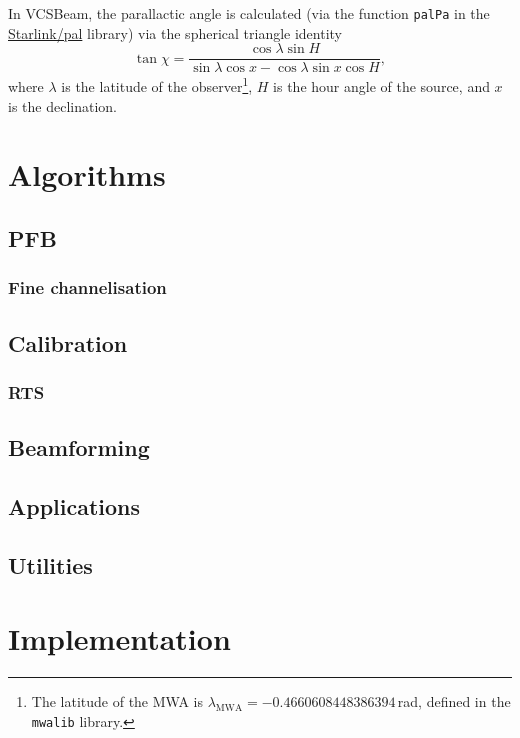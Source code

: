 \documentclass{book}
\newcommand{\vcsbeam}{{\sc VCSBeam}}
\begin{document}
In \vcsbeam{}, the parallactic angle is calculated (via the function \texttt{palPa} in the \href{https://github.com/Starlink/pal}{Starlink/pal} library) via the spherical triangle identity
\begin{equation}
    \tan \chi = \frac{\cos \lambda \sin H}{\sin\lambda \cos x - \cos \lambda \sin x \cos H},
\end{equation}
where $\lambda$ is the latitude of the observer\footnote{The latitude of the MWA is $\lambda_\text{MWA} = -0.4660608448386394\,$rad, defined in the \texttt{mwalib} library.}, $H$ is the hour angle of the source, and $x$ is the declination.

\chapter{Algorithms}

\section{PFB}

\subsection{Fine channelisation}

\section{Calibration}

\subsection{RTS}

\section{Beamforming}

\section{Applications}

\section{Utilities}

\chapter{Implementation}
\end{document}
